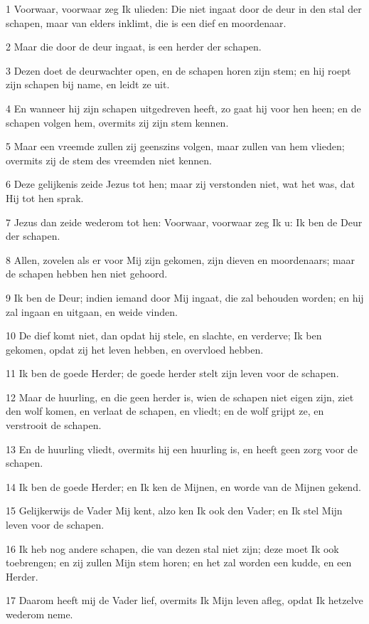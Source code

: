 \par 1 Voorwaar, voorwaar zeg Ik ulieden: Die niet ingaat door de deur in den stal der schapen, maar van elders inklimt, die is een dief en moordenaar.
\par 2 Maar die door de deur ingaat, is een herder der schapen.
\par 3 Dezen doet de deurwachter open, en de schapen horen zijn stem; en hij roept zijn schapen bij name, en leidt ze uit.
\par 4 En wanneer hij zijn schapen uitgedreven heeft, zo gaat hij voor hen heen; en de schapen volgen hem, overmits zij zijn stem kennen.
\par 5 Maar een vreemde zullen zij geenszins volgen, maar zullen van hem vlieden; overmits zij de stem des vreemden niet kennen.
\par 6 Deze gelijkenis zeide Jezus tot hen; maar zij verstonden niet, wat het was, dat Hij tot hen sprak.
\par 7 Jezus dan zeide wederom tot hen: Voorwaar, voorwaar zeg Ik u: Ik ben de Deur der schapen.
\par 8 Allen, zovelen als er voor Mij zijn gekomen, zijn dieven en moordenaars; maar de schapen hebben hen niet gehoord.
\par 9 Ik ben de Deur; indien iemand door Mij ingaat, die zal behouden worden; en hij zal ingaan en uitgaan, en weide vinden.
\par 10 De dief komt niet, dan opdat hij stele, en slachte, en verderve; Ik ben gekomen, opdat zij het leven hebben, en overvloed hebben.
\par 11 Ik ben de goede Herder; de goede herder stelt zijn leven voor de schapen.
\par 12 Maar de huurling, en die geen herder is, wien de schapen niet eigen zijn, ziet den wolf komen, en verlaat de schapen, en vliedt; en de wolf grijpt ze, en verstrooit de schapen.
\par 13 En de huurling vliedt, overmits hij een huurling is, en heeft geen zorg voor de schapen.
\par 14 Ik ben de goede Herder; en Ik ken de Mijnen, en worde van de Mijnen gekend.
\par 15 Gelijkerwijs de Vader Mij kent, alzo ken Ik ook den Vader; en Ik stel Mijn leven voor de schapen.
\par 16 Ik heb nog andere schapen, die van dezen stal niet zijn; deze moet Ik ook toebrengen; en zij zullen Mijn stem horen; en het zal worden een kudde, en een Herder.
\par 17 Daarom heeft mij de Vader lief, overmits Ik Mijn leven afleg, opdat Ik hetzelve wederom neme.
